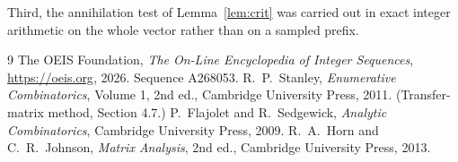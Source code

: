 \documentclass[11pt,a4paper]{article}
\theoremstyle{plain}
\theoremstyle{definition}
\begin{document}
Third, the annihilation test of Lemma~\ref{lem:crit} was carried out in exact integer
arithmetic on the whole vector rather than on a sampled prefix.

\begin{thebibliography}{9}
 The OEIS Foundation, \emph{The On-Line Encyclopedia of Integer
Sequences}, \url{https://oeis.org}, 2026. Sequence A268053.
 R.~P.~Stanley, \emph{Enumerative Combinatorics}, Volume 1, 2nd ed.,
Cambridge University Press, 2011. (Transfer-matrix method, Section 4.7.)
 P.~Flajolet and R.~Sedgewick, \emph{Analytic Combinatorics}, Cambridge
University Press, 2009.
 R.~A.~Horn and C.~R.~Johnson, \emph{Matrix Analysis}, 2nd ed., Cambridge
University Press, 2013.
\end{thebibliography}
\end{document}

